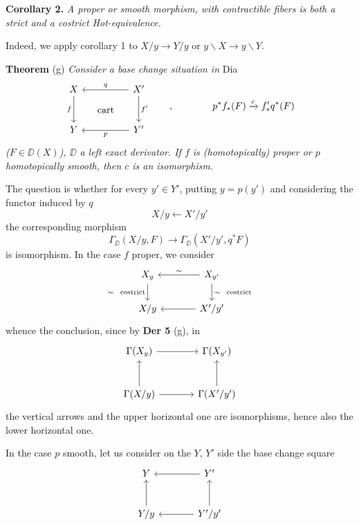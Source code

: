 \noindent\textbf{Corollary 2.} \textit{A proper or smooth morphism, with contractible fibers is both a strict and a costrict Hot-equivalence.}

Indeed, we apply corollary 1 to $X/y \to Y/y$ or $y\backslash X \to y\backslash Y$.

\noindent\textbf{Theorem} (g) \textit{Consider a base change situation in} \textsf{Dia}
\[
\begin{tikzcd}[row sep=large, column sep=huge]
X \arrow[d, "f"'] \arrow[dr, phantom, "\text{cart}"] & X' \arrow[l, "q"'] \arrow[d, "f'"] \\
Y & Y' \arrow[l, "p"]
\end{tikzcd}
\qquad , \qquad\qquad p^*f_*(F) \xrightarrow{c} f'_*q^*(F)
\]
\textit{($F \in \DD(X)$), $\DD$ a left exact derivator. If $f$ is (homotopically) proper or $p$ homotopically smooth, then $c$ is an isomorphism.}

\noindent{}
The question is whether for every $y' \in Y'$, putting $y = p(y')$ and considering the functor induced by $q$
\[
X/y \longleftarrow X'/y'
\]
the corresponding morphism
\[
\Gamma_{\DD}(X/y, F) \longrightarrow \Gamma_{\DD}(X'/y', q^*F)
\]
is isomorphism. In the case $f$ proper, we consider
\[
\begin{tikzcd}[column sep=large]
X_y \arrow[d, "\sim\ \ \text{costrict}"'] & X_{y'} \arrow[l, "\sim"'] \arrow[d, "\sim\ \ \text{costrict}"] \\
X/y & X'/y' \arrow[l]
\end{tikzcd}
\]
whence the conclusion, since by \textbf{Der 5} (g), in
\[
\begin{tikzcd}[row sep=large, column sep=large]
\Gamma(X_y) \arrow[r] & \Gamma(X_{y'}) \\
\Gamma(X/y) \arrow[u] \arrow[r] & \Gamma(X'/y') \arrow[u]
\end{tikzcd}
\]
the vertical arrows and the upper horizontal one are isomorphisms, hence also the lower horizontal one.


In the case $p$ smooth, let us consider on the $Y$, $Y'$ side the base change square %
\[
\begin{tikzcd}[row sep=large, column sep=large]
Y & Y' \arrow[l] \\
Y/y \arrow[u] & Y'/y' \arrow[l] \arrow[u]
\end{tikzcd}
\]


